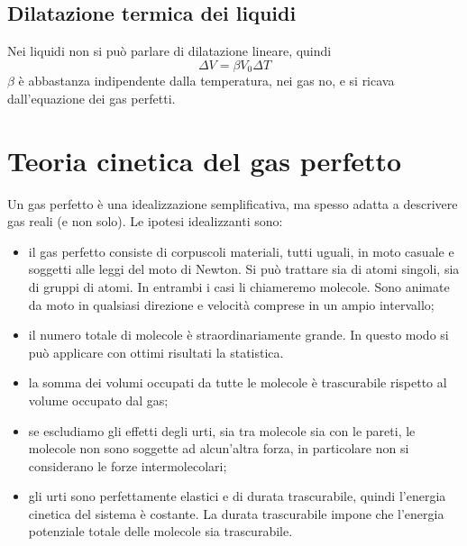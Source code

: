 \subsection{Dilatazione termica dei liquidi}
Nei liquidi non si può parlare di dilatazione lineare, quindi
\begin{equation}
   \Delta V=\beta V_0\Delta T
\end{equation}
$\beta$ è abbastanza indipendente dalla temperatura, nei gas no, e si ricava dall'equazione dei gas perfetti.

\section{Teoria cinetica del gas perfetto}
\label{gas perfetto}
Un gas perfetto è una idealizzazione semplificativa, ma spesso adatta a descrivere gas reali (e non solo). Le ipotesi idealizzanti sono:
\begin{itemize}
   \item il gas perfetto consiste di corpuscoli materiali, tutti uguali, in moto casuale e soggetti alle leggi del moto di Newton. Si può trattare sia di atomi singoli, sia di gruppi di atomi. In entrambi i casi li chiameremo molecole. Sono animate da moto in qualsiasi direzione e velocità comprese in un ampio intervallo;
   \item il numero totale di molecole è straordinariamente grande. In questo modo si può applicare con ottimi risultati la statistica.
   \item la somma dei volumi occupati da tutte le molecole è trascurabile rispetto al volume occupato dal gas;
   \item se escludiamo gli effetti degli urti, sia tra molecole sia con le pareti, le molecole non sono soggette ad alcun'altra forza, in particolare non si considerano le forze intermolecolari;
   \item gli urti sono perfettamente elastici e di durata trascurabile, quindi l'energia cinetica del sistema è costante. La durata trascurabile impone che l'energia potenziale totale delle molecole sia trascurabile.
\end{itemize}
